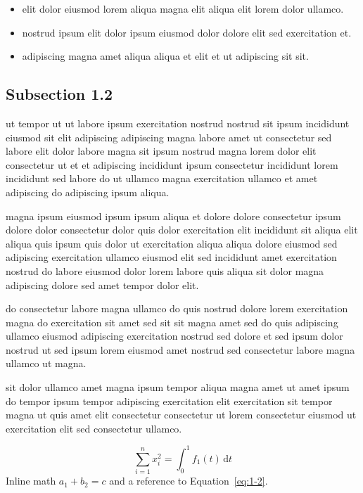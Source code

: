 \documentclass{article}
\begin{document}
\begin{itemize}
  \item elit dolor eiusmod lorem aliqua magna elit aliqua elit lorem dolor ullamco.
  \item nostrud ipsum elit dolor ipsum eiusmod dolor dolore elit sed exercitation et.
  \item adipiscing magna amet aliqua aliqua et elit et ut adipiscing sit sit.
\end{itemize}

\subsection{Subsection 1.2}\label{sec:1-2}
ut tempor ut ut labore ipsum exercitation nostrud nostrud sit ipsum incididunt eiusmod sit elit adipiscing adipiscing magna labore amet ut consectetur sed labore elit dolor labore magna sit ipsum nostrud magna lorem dolor elit consectetur ut et et adipiscing incididunt ipsum consectetur incididunt lorem incididunt sed labore do ut ullamco magna exercitation ullamco et amet adipiscing do adipiscing ipsum aliqua.

magna ipsum eiusmod ipsum ipsum aliqua et dolore dolore consectetur ipsum dolore dolor consectetur dolor quis dolor exercitation elit incididunt sit aliqua elit aliqua quis ipsum quis dolor ut exercitation aliqua aliqua dolore eiusmod sed adipiscing exercitation ullamco eiusmod elit sed incididunt amet exercitation nostrud do labore eiusmod dolor lorem labore quis aliqua sit dolor magna adipiscing dolore sed amet tempor dolor elit.

do consectetur labore magna ullamco do quis nostrud dolore lorem exercitation magna do exercitation sit amet sed sit sit magna amet sed do quis adipiscing ullamco eiusmod adipiscing exercitation nostrud sed dolore et sed ipsum dolor nostrud ut sed ipsum lorem eiusmod amet nostrud sed consectetur labore magna ullamco ut magna.

sit dolor ullamco amet magna ipsum tempor aliqua magna amet ut amet ipsum do tempor ipsum tempor adipiscing exercitation elit exercitation sit tempor magna ut quis amet elit consectetur consectetur ut lorem consectetur eiusmod ut exercitation elit sed consectetur ullamco.

\begin{equation}\label{eq:1-2}
  \sum_{i=1}^{n} x_i^{2} = \int_0^1 f_{1}(t)\,\mathrm{d}t
\end{equation}
Inline math $a_{1} + b_{2} = c$ and a reference to Equation~\eqref{eq:1-2}.
\end{document}
